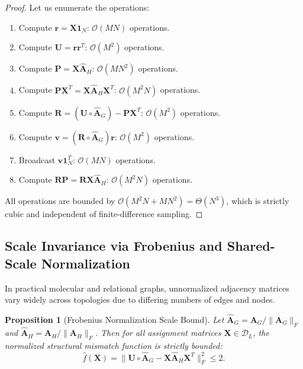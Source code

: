 \documentclass[conference]{IEEEtran}
\newtheorem{proposition}{Proposition}
\begin{document}
\begin{proof}
Let us enumerate the operations:
\begin{enumerate}
    \item Compute $\mathbf{r} = \mathbf{X}\mathbf{1}_N$: $\mathcal{O}(MN)$ operations.
    \item Compute $\mathbf{U} = \mathbf{r}\mathbf{r}^T$: $\mathcal{O}(M^2)$ operations.
    \item Compute $\mathbf{P} = \mathbf{X}\hat{\mathbf{A}}_H$: $\mathcal{O}(MN^2)$ operations.
    \item Compute $\mathbf{P}\mathbf{X}^T = \mathbf{X}\hat{\mathbf{A}}_H\mathbf{X}^T$: $\mathcal{O}(M^2N)$ operations.
    \item Compute $\mathbf{R} = (\mathbf{U} \circ \hat{\mathbf{A}}_G) - \mathbf{P}\mathbf{X}^T$: $\mathcal{O}(M^2)$ operations.
    \item Compute $\mathbf{v} = (\mathbf{R} \circ \hat{\mathbf{A}}_G)\mathbf{r}$: $\mathcal{O}(M^2)$ operations.
    \item Broadcast $\mathbf{v}\mathbf{1}_N^T$: $\mathcal{O}(MN)$ operations.
    \item Compute $\mathbf{R}\mathbf{P} = \mathbf{R}\mathbf{X}\hat{\mathbf{A}}_H$: $\mathcal{O}(M^2N)$ operations.
\end{enumerate}
All operations are bounded by $\mathcal{O}(M^2N + MN^2) = \Theta(N^3)$, which is strictly cubic and independent of finite-difference sampling.
\end{proof}

\subsection{Scale Invariance via Frobenius and Shared-Scale Normalization}

In practical molecular and relational graphs, unnormalized adjacency matrices vary widely across topologies due to differing numbers of edges and nodes.

\begin{proposition}[Frobenius Normalization Scale Bound]
\label{prop:normalization}
Let $\hat{\mathbf{A}}_G = \mathbf{A}_G / \|\mathbf{A}_G\|_F$ and $\hat{\mathbf{A}}_H = \mathbf{A}_H / \|\mathbf{A}_H\|_F$. Then for all assignment matrices $\mathbf{X} \in \mathcal{D}_L$, the normalized structural mismatch function is strictly bounded:
\begin{equation}
\hat{f}(\mathbf{X}) = \big\| \mathbf{U} \circ \hat{\mathbf{A}}_G - \mathbf{X}\hat{\mathbf{A}}_H\mathbf{X}^T \big\|_F^2 \leq 2.
\label{eq:norm_bound}
\end{equation}
\end{proposition}
\end{document}

